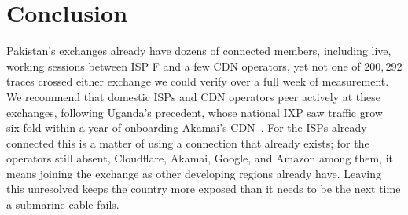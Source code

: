\documentclass[sigconf,anonymous,10pt]{acmart}
\begin{document}
\section{Conclusion}
Pakistan's exchanges already have dozens of connected members, including live, working sessions between ISP F and a few CDN operators, yet not one of $200,292$ traces crossed either exchange we could verify over a full week of measurement. We recommend that domestic ISPs and CDN operators peer actively at these exchanges, following Uganda's precedent, whose national IXP saw traffic grow six-fold within a year of onboarding Akamai's CDN~\cite{obriain2017rebuilding}. For the ISPs already connected this is a matter of using a connection that already exists; for the operators still absent, Cloudflare, Akamai, Google, and Amazon among them, it means joining the exchange as other developing regions already have. Leaving this unresolved keeps the country more exposed than it needs to be the next time a submarine cable fails.
\end{document}
